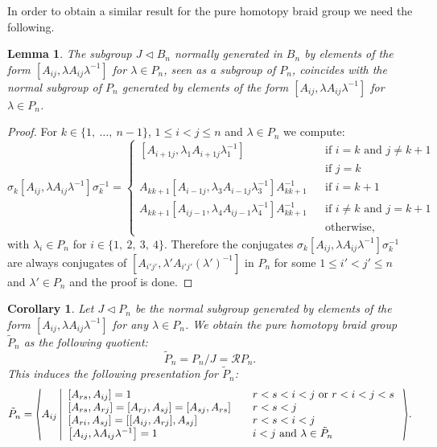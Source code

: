\documentclass[11pt, a4paper, twoside,reqno]{amsart}
\newtheorem{lem}[thm]{Lemma}
\newtheorem{cor}[thm]{Corollary}
\begin{document}
In order to obtain a similar result for the pure homotopy braid group we need the following.
\begin{lem}\label{lemJnormalygene}
The subgroup $J\triangleleft B_n$ normally generated in $B_n$ by elements of the form $[A_{ij},\lambda A_{ij} \lambda^{-1}]$ for $\lambda\in P_n$, seen as a subgroup of $P_n$, coincides with the normal subgroup of $P_n$ generated by elements of the form  $[A_{ij},\lambda A_{ij} \lambda^{-1}]$ for $\lambda\in P_n$.
\end{lem}
\begin{proof}
For $k\in\{1,\ \ldots,\ n-1\}$, $1\leq i<j\leq n$ and $\lambda \in P_n$ we compute:
$$\sigma_k[A_{ij},\lambda A_{ij}\lambda^{-1}]\sigma_k^{-1}=\left\{
\begin{array}{lcl}
[A_{i+1j},\lambda_1 A_{i+1j}\lambda_1^{-1}]&&\text{if }i=k\text{ and }j\neq k+1 \\

[A_{i+1j},\lambda_2 A_{i+1j}\lambda_2^{-1}]&&\text{if }j=k\\

A_{kk+1}[A_{i-1j},\lambda_3 A_{i-1j}\lambda_3^{-1}]A_{kk+1}^{-1}&&\text{if }i=k+1\\

A_{kk+1}[A_{ij-1},\lambda_4 A_{ij-1}\lambda_4^{-1}]A_{kk+1}^{-1}&&\text{if }i\neq k\text{ and }j=k+1\\

[A_{ij},\lambda A_{ij}\lambda^{-1}]&&\text{otherwise},
\end{array}\right.$$
with $\lambda_i\in P_n$ for $i\in\{1,\ 2,\ 3,\ 4\}$. Therefore the conjugates $\sigma_k[A_{ij},\lambda A_{ij}\lambda^{-1}]\sigma_k^{-1}$ are always conjugates of $[A_{i'j'},\lambda' A_{i'j'}(\lambda')^{-1}]$ in $P_n$ for some $1\leq i'<j'\leq n$ and $\lambda'\in P_n$ and the proof is done.
\end{proof}
\begin{cor}\label{coropresentation}
Let $J\triangleleft P_n$ be the normal subgroup generated by elements of the form $[A_{ij},\lambda A_{ij} \lambda^{-1}]$ for any $\lambda\in P_n$. We obtain the pure homotopy braid group $\tilde P_n$ as the following quotient:
$$\tilde P_n=P_n/J=\mathcal RP_n.$$
This induces the following presentation for $\tilde P_n$:
  $$\tilde P_n=\scaleleftright[1.3ex]{\langle}{A_{ij}\left|
  \begin{array}{lll}
    [A_{rs},A_{ij}]=1 & & r<s<i<j\mbox{ or } r<i<j<s\\  
    \left[A_{rs},A_{rj}\right]=[A_{rj},A_{sj}]=[A_{sj},A_{rs}]& & r<s<j\\
    \left[A_{ri},A_{sj}\right]=[[A_{ij},A_{rj}],A_{sj}]& &r<s<i<j\\  
    \left[A_{ij},\lambda A_{ij} \lambda^{-1}\right]=1 & & i<j \mbox{ and } \lambda\in \tilde P_n
 \end{array}\right.}{\rangle}.$$
\end{cor}
\end{document}
